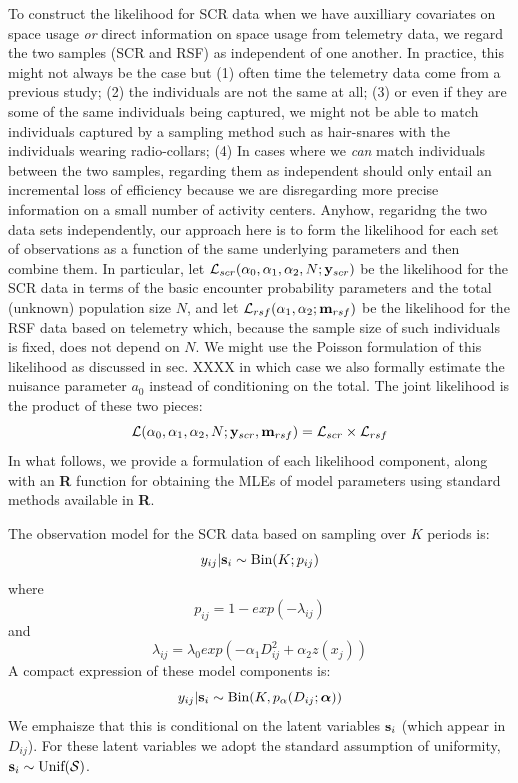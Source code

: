 To construct the likelihood for SCR data when we have auxilliary
covariates on space usage {\it or} direct information on space usage
from telemetry data, we regard the two samples (SCR and RSF) as
independent of one another. In practice, this might not always be the
case but (1) often time the telemetry data come from a previous study;
(2) the individuals are not the same at all; (3) or even if they are
some of the same individuals being captured, we might not be able to
match individuals captured by a sampling method such as hair-snares
with the individuals wearing radio-collars; (4) In cases where we {\it
  can} match individuals between the two samples, regarding them as
independent should only entail an incremental loss of efficiency
because we are disregarding more precise information on a small number
of activity centers.
Anyhow, regaridng the two data sets independently, our approach here
is to form the likelihood for each set of observations as a function
of the same underlying parameters and then combine them. In
particular, let ${\cal L}_{scr}(\alpha_{0}, \alpha_{1}, \alpha_{2}, N;
{\bf y}_{scr})$
be the likelihood for the SCR data in terms of the basic encounter
probability parameters and the total (unknown) population size $N$,
and let ${\cal L}_{rsf}(\alpha_{1},\alpha_{2}; {\bf m}_{rsf})$ be the
likelihood for the RSF data based on telemetry which, because the
sample size of such individuals is fixed, does not depend on $N$. We
might use the Poisson formulation of this likelihood as discussed in
sec. XXXX in which case
we also formally estimate the nuisance parameter $a_{0}$ instead of
conditioning on the total.
The
joint likelihood is the product of these two pieces:
\[
{\cal L}(\alpha_{0},\alpha_{1},\alpha_{2},N; {\bf y}_{scr},{\bf
  m}_{rsf})  = {\cal L}_{scr} \times {\cal L}_{rsf}
\]
In what follows, we provide a formulation of each likelihood
component, along with an {\bf R} function for obtaining the MLEs of
model parameters using standard methods available in {\bf R}.

The observation model for the SCR data based on
sampling over $K$ periods  is:
\[
 y_{ij}|{\bf s}_{i} \sim \mbox{Bin}(K; p_{ij})
\]
where
\[
 p_{ij} = 1-exp(- \lambda_{ij} )
\]
and
\[
 \lambda_{ij} = \lambda_{0} exp(- \alpha_{1} D_{ij}^{2} + \alpha_{2}  z(x_{j}) )
\]
 A compact expression of these
model components is:
\begin{equation}
y_{ij}| {\bf s}_{i} \sim \mbox{Bin}(K, p_{\alpha}(D_{ij}; {\bm \alpha}))
\label{rsf.mle.eq.cond-on-s}
\end{equation}
We emphaisze that this is conditional on the latent variables ${\bf
  s}_{i}$ (which appear in $D_{ij}$). For these latent variables we
adopt the standard assumption of uniformity,
${\bf s}_{i} \sim  \mbox{Unif}({\cal  S})$.


